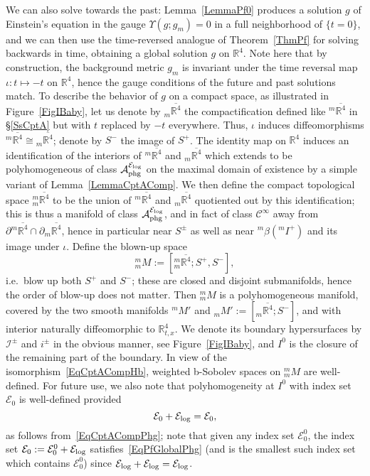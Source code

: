 \documentclass[reqno,11pt,letterpaper]{amsart}
\numberwithin{equation}{section}
\numberwithin{figure}{section}
\theoremstyle{definition}
\theoremstyle{remark}
\newcommand{\mc}{\mathcal}
\newcommand{\cA}{\mc A}
\newcommand{\cC}{\mc C}
\newcommand{\cE}{\mc E}
\newcommand{\ms}{\mathscr}
\newcommand{\scri}{\ms I}
\newcommand{\R}{\mathbb{R}}
\newcommand{\Ups}{\Upsilon}
\newcommand{\ol}{\overline}
\newcommand{\pa}{\partial}
\newcommand{\CI}{\cC^\infty}
\newcommand{\phg}{{\mathrm{phg}}}
\begin{document}
We can also solve towards the past: Lemma~\ref{LemmaPf0} produces a solution $g$ of Einstein's equation in the gauge $\Ups(g;g_m)=0$ in a full neighborhood of $\{t=0\}$, and we can then use the time-reversed analogue of Theorem~\ref{ThmPf} for solving backwards in time, obtaining a global solution $g$ on $\R^4$. Note here that by construction, the background metric $g_m$ is invariant under the time reversal map $\iota\colon t\mapsto -t$ on $\R^4$, hence the gauge conditions of the future and past solutions match. To describe the behavior of $g$ on a compact space, as illustrated in Figure~\ref{FigIBaby}, let us denote by ${}_m\ol{\R^4}$ the compactification defined like ${}^m\ol{\R^4}$ in \S\ref{SsCptA} but with $t$ replaced by $-t$ everywhere. Thus, $\iota$ induces diffeomorphisms ${}^m\ol{\R^4}\cong{}_m\ol{\R^4}$; denote by $S^-$ the image of $S^+$. The identity map on $\R^4$ induces an identification of the interiors of ${}^m\ol{\R^4}$ and ${}_m\ol{\R^4}$ which extends to be polyhomogeneous of class $\cA_\phg^{\cE_{\rm log}}$ on the maximal domain of existence by a simple variant of Lemma~\ref{LemmaCptAComp}. We then define the compact topological space ${}^m_m\ol{\R^4}$ to be the union of ${}^m\ol{\R^4}$ and ${}_m\ol{\R^4}$ quotiented out by this identification; this is thus a manifold of class $\cA_\phg^{\cE_{\rm log}}$, and in fact of class $\CI$ away from $\pa{}^m\ol{\R^4}\cap\pa{}_m\ol{\R^4}$, hence in particular near $S^\pm$ as well as near ${}^m\beta({}^m I^+)$ and its image under $\iota$. Define the blown-up space
\[
  {}^m_m M := [{}^m_m\ol{\R^4};S^+,S^-],
\]
i.e.\ blow up both $S^+$ and $S^-$; these are closed and disjoint submanifolds, hence the order of blow-up does not matter. Then ${}^m_m M$ is a polyhomogeneous manifold, covered by the two smooth manifolds ${}^m\!M'$ and ${}_m\!M':=[{}_m\ol{\R^4};S^-]$, and with interior naturally diffeomorphic to $\R^4_{t,x}$. We denote its boundary hypersurfaces by $\scri^\pm$ and $i^\pm$ in the obvious manner, see Figure~\ref{FigIBaby}, and $I^0$ is the closure of the remaining part of the boundary. In view of the isomorphism~\eqref{EqCptACompHb}, weighted b-Sobolev spaces on ${}^m_m\!M$ are well-defined. For future use, we also note that polyhomogeneity at $I^0$ with index set $\cE_0$ is well-defined provided
\begin{equation}
\label{EqPfGlobalPhg}
  \cE_0+\cE_{\rm log}=\cE_0,
\end{equation}
as follows from~\eqref{EqCptACompPhg}; note that given any index set $\cE_0^0$, the index set $\cE_0:=\cE_0^0+\cE_{\rm log}$ satisfies~\eqref{EqPfGlobalPhg} (and is the smallest such index set which contains $\cE_0^0$) since $\cE_{\rm log}+\cE_{\rm log}=\cE_{\rm log}$.
\end{document}
